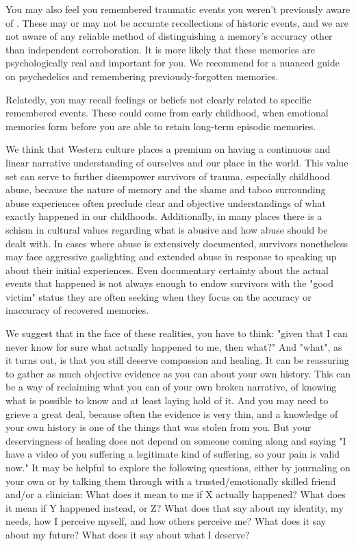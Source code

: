 \documentclass[12pt,letterpaper]{book}
\begin{document}
You may also feel you remembered traumatic events you weren't previously aware of \cite{psychedelicrecoveredmemory}. These may or may not be accurate recollections of historic events, and we are not aware of any reliable method of distinguishing a memory's accuracy other than independent corroboration. It is more likely that these memories are psychologically real and important for you. We recommend \textcite{psychedelicrecoveredmemory} for a nuanced guide on psychedelics and remembering previously-forgotten memories.

Relatedly, you may recall feelings or beliefs not clearly related to specific remembered events. These could come from early childhood, when emotional memories form before you are able to retain long-term episodic memories.

We think that Western culture places a premium on having a continuous and linear narrative understanding of ourselves and our place in the world. This value set can serve to further disempower survivors of trauma, especially childhood abuse, because the nature of memory and the shame and taboo surrounding abuse experiences often preclude clear and objective understandings of what exactly happened in our childhoods. Additionally, in many places there is a schism in cultural values regarding what is abusive and how abuse should be dealt with. In cases where abuse is extensively documented, survivors nonetheless may face aggressive gaslighting and extended abuse in response to speaking up about their initial experiences. Even documentary certainty about the actual events that happened is not always enough to endow survivors with the "good victim" status they are often seeking when they focus on the accuracy or inaccuracy of recovered memories.

We suggest that in the face of these realities, you have to think: "given that I can never know for sure what actually happened to me, then what?" And "what", as it turns out, is that you still deserve compassion and healing. It can be reassuring to gather as much objective evidence as you can about your own history. This can be a way of reclaiming what you can of your own broken narrative, of knowing what is possible to know and at least laying hold of it. And you may need to grieve a great deal, because often the evidence is very thin, and a knowledge of your own history is one of the things that was stolen from you. But your deservingness of healing does not depend on someone coming along and saying "I have a video of you suffering a legitimate kind of suffering, so your pain is valid now." It may be helpful to explore the following questions, either by journaling on your own or by talking them through with a trusted/emotionally skilled friend and/or a clinician: What does it mean to me if X actually happened? What does it mean if Y happened instead, or Z? What does that say about my identity, my needs, how I perceive myself, and how others perceive me? What does it say about my future? What does it say about what I deserve?
\end{document}
